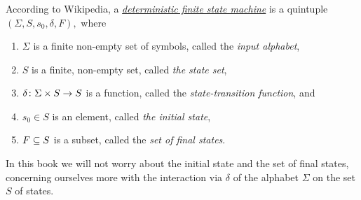 \documentclass[CT4S-EN-RU]{subfiles}
\begin{document}
\subsubsection{}\label{sec:FSMs}

\begin{blockENG}
According to Wikipedia, a \href{http://en.wikipedia.org/wiki/Finite_state_machine#Mathematical_model}{\em deterministic finite state machine} is a quintuple $(\Sigma,S,s_0,\delta,F),$ where
\begin{enumerate}
\item $\Sigma$ is a finite non-empty set of symbols, called the {\em input alphabet},
\item $S$ is a finite, non-empty set, called {\em the state set},
\item $\delta\taking \Sigma\times S\to S$ is a function, called the {\em state-transition function}, and
\item $s_0\in S$ is an element, called {\em the initial state},
\item $F\ss S$ is a subset, called the {\em set of final states}.
\end{enumerate}
\end{blockENG}

\begin{blockRUS}
\end{blockRUS}

\begin{blockENG}
In this book we will not worry about the initial state and the set of final states, concerning ourselves more with the interaction via $\delta$ of the alphabet $\Sigma$ on the set $S$ of states.
\end{blockENG}

\begin{blockRUS}
\end{blockRUS}
\end{document}
